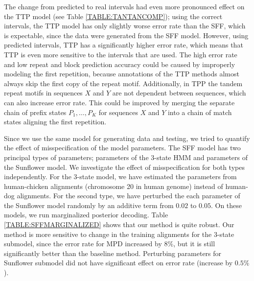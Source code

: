 The change from predicted to real intervals had even more pronounced effect on
the TTP model (see Table \ref{TABLE:TANTANCOMP}); using the correct intervals,
the TTP model has only slightly worse error rate than the SFF, which is
expectable, since the data were generated from the SFF model. However, using
predicted intervals, TTP has a significantly higher error rate, which means
that TTP is even more sensitive to the intervals that are used. The high error
rate and low repeat and block prediction accuracy could be caused by improperly
modeling the first repetition, because annotations of the TTP methods almost
always skip the first copy of the repeat motif. Additionally, in TPP the
tandem repeat motifs in sequences $X$ and $Y$ are not dependent between sequences, which can  also increase
error rate.  This could be improved by merging the separate chain of prefix
states $P_1, \dots, P_K$ for sequences $X$ and $Y$ into a chain of match states
aligning the first repetition.


Since we use the same model for generating data and testing, we tried to
quantify the effect of misspecification of the model parameters. The SFF model
has two principal types of parameters; parameters of the 3-state HMM and
parameters of the Sunflower model. We investigate the effect of
{misspecification} for both types independently. For the 3-state
model, we have estimated the parameters from human-chicken alignments (chromosome 20 in human genome) instead of
human-dog alignments. For the second type, we have perturbed the each parameter
of the Sunflower model randomly by an additive term from $0.02$ to $0.05$. On these
models, we run marginalized posterior decoding. Table
\ref{TABLE:SFFMARGINALIZED} shows that our method is quite robust. Our method
is more sensitive to change in the training alignments for the 3-state submodel, since the error rate for
MPD increased by $8\%$, but it is still significantly better than the baseline
method. Perturbing parameters for Sunflower submodel did not have significant
effect on error rate (increase by $0.5\%$). 

